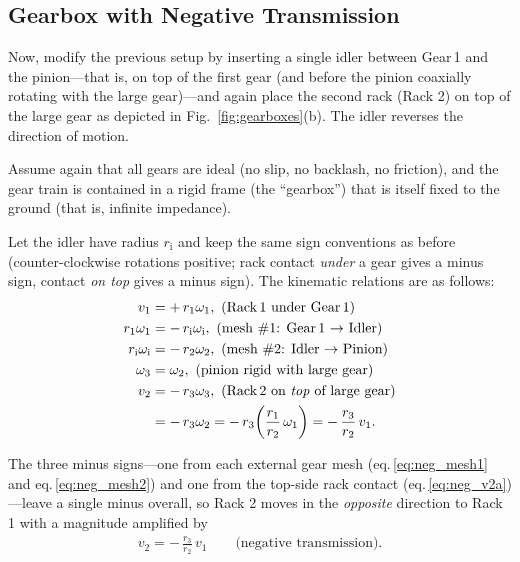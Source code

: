 \documentclass[reprint,aps,pra,superscriptaddress,longbibliography]{revtex4-2}
\begin{document}
\subsection{Gearbox with Negative Transmission}

Now, modify the previous setup by
inserting a single idler between Gear\,1 and the pinion---that is,
on top of the first gear (and before the pinion coaxially rotating with the large gear)---and
again place the second rack (Rack 2) on top of the large gear as depicted in Fig.~\ref{fig:gearboxes}(b).
The idler reverses the direction of motion.

Assume again that all gears are ideal (no slip, no backlash, no friction), and the gear train is contained in a rigid frame (the ``gearbox'') that is itself fixed to the ground (that is, infinite impedance).



Let the idler have radius $r_{\mathrm{i}}$ and keep the same sign
conventions as before (counter-clockwise rotations positive; rack contact
\emph{under} a gear gives a minus sign, contact \emph{on top} gives a minus sign).
The kinematic relations are as follows:
\begin{align}
v_1 &= +\,r_1 \omega_1 ,
       \text{ (Rack\,1 under Gear\,1)} \label{eq:neg_v1}\\
r_1 \omega_1 &= -\,r_{\mathrm{i}} \omega_{\mathrm{i}} ,
       \text{ (mesh \#1: Gear\,1 $\to$ Idler)} \label{eq:neg_mesh1}\\
r_{\mathrm{i}} \omega_{\mathrm{i}} &= -\,r_2 \omega_2 ,
       \text{ (mesh \#2: Idler $\to$ Pinion)} \label{eq:neg_mesh2}\\
\omega_3 &= \omega_2 ,
       \text{ (pinion rigid with large gear)} \label{eq:neg_rigid}\\
v_2 &= -\,r_3 \omega_3 ,
       \text{ (Rack\,2 on \emph{top} of large gear)} \label{eq:neg_v2a}\\
     &= -\,r_3 \omega_2
      = -\,r_3  \!\left( \frac{r_1}{r_2}\,\omega_1 \right)
        = -\,\frac{r_3}{r_2}\,v_1 .           \label{eq:neg_v2b}
\end{align}

The three minus signs---one from each external gear mesh
(eq.\,\ref{eq:neg_mesh1} and eq.\,\ref{eq:neg_mesh2}) and one from the
top-side rack contact (eq.\,\ref{eq:neg_v2a})---leave a single minus overall,
so Rack 2 moves in the \emph{opposite} direction to Rack 1 with a magnitude
amplified by
\begin{align}
   v_2 = -\,\frac{r_3}{r_2}\,v_1 \qquad \text{(negative transmission).}
\end{align}
\end{document}
